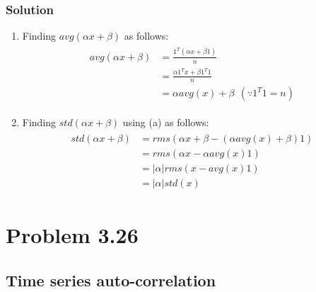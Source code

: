 \documentclass{article}
\begin{document}
\subsubsection*{Solution}
  \begin{enumerate}[label=(\alph*)]
      \item Finding $avg(\alpha x + \beta)$ as follows:
      \begin{align*}
    \begin{split}
        avg(\alpha x + \beta) & = \frac{1^T(\alpha x + \beta 1)}{n}\\
        & = \frac{\alpha 1^T x + \beta 1^T 1}{n}\\
        & = \alpha avg(x) + \beta\ \ (\because 1^T1 = n)
    \end{split}
      \end{align*}
    \item Finding $std(\alpha x + \beta)$ using (a) as follows:
    \begin{align*}
    \begin{split}
        std(\alpha x + \beta) & = rms(\alpha x + \beta - (\alpha avg(x) + \beta)1)\\
        & = rms(\alpha x - \alpha avg(x)1)\\
        & = |\alpha|rms(x-avg(x)1)\\
        & = |\alpha|std(x)
    \end{split}
    \end{align*}
  \end{enumerate}
\section*{Problem 3.26}
\subsection*{Time series auto-correlation}
\end{document}
